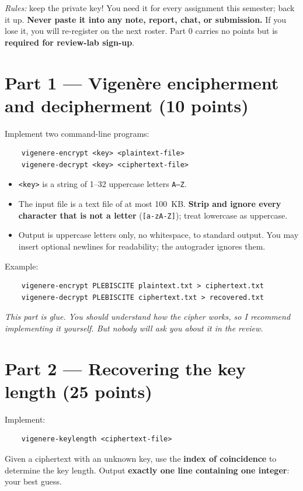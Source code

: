 \documentclass[11pt]{article}
\newcommand{\code}[1]{\texttt{#1}}
\begin{document}
\medskip\noindent\emph{Rules:} keep the private key! You need it for every assignment this semester; back it up. \textbf{Never paste it into any note, report, chat, or submission.} If you lose it, you will re-register on the next roster. Part 0 carries no points but is \textbf{required for review-lab sign-up}.

\section*{Part 1 --- Vigen\`ere encipherment and decipherment (10 points)}

Implement two command-line programs:
\begin{verbatim}
    vigenere-encrypt <key> <plaintext-file>
    vigenere-decrypt <key> <ciphertext-file>
\end{verbatim}
\begin{itemize}
\item \code{<key>} is a string of 1--32 uppercase letters \code{A--Z}.
\item The input file is a text file of at most 100~KB. \textbf{Strip and ignore every character that is not a letter} (\code{[a-zA-Z]}); treat lowercase as uppercase.
\item Output is uppercase letters only, no whitespace, to standard output. You may insert optional newlines for readability; the autograder ignores them.
\end{itemize}

\medskip \noindent
Example:
\begin{verbatim}
    vigenere-encrypt PLEBISCITE plaintext.txt > ciphertext.txt
    vigenere-decrypt PLEBISCITE ciphertext.txt > recovered.txt
\end{verbatim}
\emph{This part is glue. You should understand how the cipher works, so I recommend implementing it yourself. But nobody will ask you about it in the review.}

\section*{Part 2 --- Recovering the key length (25 points)}

Implement:
\begin{verbatim}
    vigenere-keylength <ciphertext-file>
\end{verbatim}
Given a ciphertext with an unknown key, use the \textbf{index of coincidence} to determine the key length. Output \textbf{exactly one line containing one integer}: your best guess.
\end{document}
